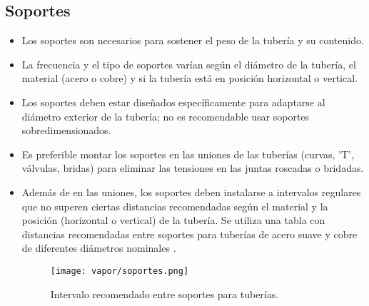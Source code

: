 \subsection{Soportes}
\begin{itemize}
    \item Los soportes son necesarios para sostener el peso de la tubería y su contenido.
    \item La frecuencia y el tipo de soportes varían según el diámetro de la tubería, el material (acero o cobre) y si la tubería está en posición horizontal o vertical.
    \item Los soportes deben estar diseñados específicamente para adaptarse al diámetro exterior de la tubería; no es recomendable usar soportes sobredimensionados.
    \item Es preferible montar los soportes en las uniones de las tuberías (curvas, 'T', válvulas, bridas) para eliminar las tensiones en las juntas roscadas o bridadas.
    \item Además de en las uniones, los soportes deben instalarse a intervalos regulares que no superen ciertas distancias recomendadas según el material y la posición (horizontal o vertical) de la tubería. Se utiliza una tabla con distancias recomendadas entre soportes para tuberías de acero suave y cobre de diferentes diámetros nominales \parencite[pág. 42]{sarco-distribucion}.
    \begin{figure}[H]
        \centering
        \caption{Intervalo recomendado entre soportes para tuberías.}
        \texttt{[image: vapor/soportes.png]}
    \end{figure}
\end{itemize}

